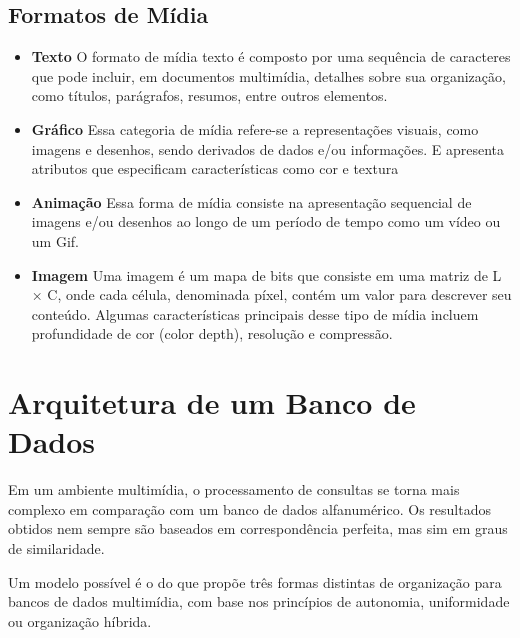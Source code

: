 \documentclass[12pt]{article}
\begin{document}
	\subsection{Formatos de Mídia}
	\begin{itemize}
		
		\item \textbf{Texto}
		O formato de mídia texto é composto por uma sequência de caracteres que pode incluir, em documentos multimídia, detalhes sobre sua organização, como títulos, parágrafos, resumos, entre outros elementos.
		
		\item \textbf{Gráfico}
		Essa categoria de mídia refere-se a representações visuais, como imagens e desenhos, sendo derivados de dados e/ou informações. E apresenta atributos que especificam características como cor e textura
		
		\item \textbf{Animação}
		Essa forma de mídia consiste na apresentação sequencial de imagens e/ou desenhos ao longo de um período de tempo como um vídeo ou um Gif.
		
		\item \textbf{Imagem}
		Uma imagem é um mapa de bits que consiste em uma matriz de L × C, onde cada célula, denominada píxel, contém um valor para descrever seu conteúdo. Algumas características principais desse tipo de mídia incluem profundidade de cor (color depth), resolução e compressão.
		
	\end{itemize}
	
	\section{Arquitetura de um Banco de Dados}
	
	Em um ambiente multimídia, o processamento de consultas se torna mais complexo em comparação com um banco de dados alfanumérico. Os resultados obtidos nem sempre são baseados em correspondência perfeita, mas sim em graus de similaridade.
	
	Um modelo possível é o do \cite{debanco} que propõe três formas distintas de organização para bancos de dados multimídia, com base nos  princípios de autonomia, uniformidade ou organização híbrida.
	
\end{document}
